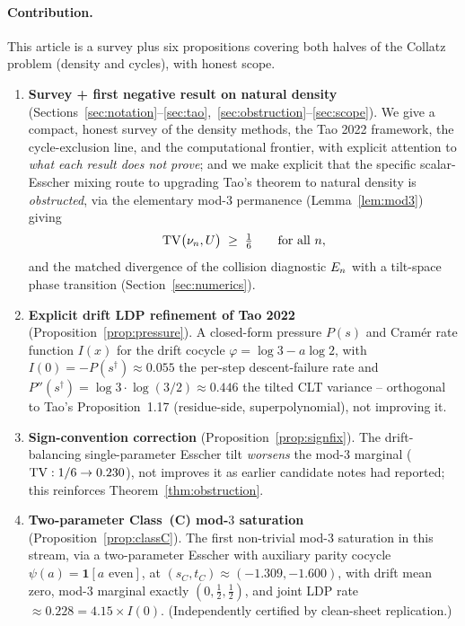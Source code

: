 \documentclass[11pt]{amsart}
\theoremstyle{definition}
\theoremstyle{remark}
\begin{document}
\paragraph{Contribution.}
This article is a survey plus six propositions covering both halves of the Collatz problem
(density and cycles), with honest scope.
\begin{enumerate}[label=(\roman*)]
\item \textbf{Survey + first negative result on natural density}
(Sections~\ref{sec:notation}--\ref{sec:tao},~\ref{sec:obstruction}--\ref{sec:scope}). We give a
compact, honest survey of the density methods, the Tao 2022 framework, the cycle-exclusion line,
and the computational frontier, with explicit attention to \emph{what each result does not prove};
and we make explicit that the specific scalar-Esscher mixing route to upgrading Tao's theorem to
natural density is \emph{obstructed}, via the elementary mod-$3$ permanence
(Lemma~\ref{lem:mod3}) giving
\begin{equation}
  \mathrm{TV}\big(\nu_n, U\big) \;\ge\; \tfrac16 \qquad \text{for all } n,
  \label{eq:headline}
\end{equation}
and the matched divergence of the collision diagnostic $E_n$ with a tilt-space phase
transition (Section~\ref{sec:numerics}).
\item \textbf{Explicit drift LDP refinement of Tao 2022} (Proposition~\ref{prop:pressure}).
A closed-form pressure $P(s)$ and Cram\'er rate function $I(x)$ for the drift cocycle
$\varphi=\log 3-a\log 2$, with $I(0)=-P(s^\dagger)\approx 0.055$ the per-step descent-failure
rate and $P''(s^\dagger)=\log 3\cdot\log(3/2)\approx 0.446$ the tilted CLT variance --
orthogonal to Tao's Proposition~1.17 (residue-side, superpolynomial), not improving it.
\item \textbf{Sign-convention correction} (Proposition~\ref{prop:signfix}). The
drift-balancing single-parameter Esscher tilt \emph{worsens} the mod-$3$ marginal
($\mathrm{TV}: 1/6\to 0.230$), not improves it as earlier candidate notes had reported; this reinforces
Theorem~\ref{thm:obstruction}.
\item \textbf{Two-parameter Class~(C) mod-$3$ saturation} (Proposition~\ref{prop:classC}). The
first non-trivial mod-$3$ saturation in this stream, via a two-parameter Esscher with auxiliary
parity cocycle $\psi(a)=\mathbf{1}[a\text{ even}]$, at $(s_C,t_C)\approx(-1.309,-1.600)$,
with drift mean zero, mod-$3$ marginal exactly $(0,\tfrac12,\tfrac12)$, and joint LDP rate
$\approx 0.228=4.15\times I(0)$. (Independently certified by clean-sheet replication.)

\end{enumerate}
\end{document}
